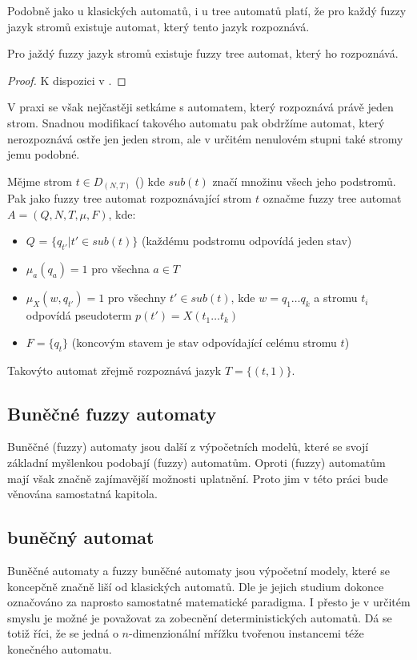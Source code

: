 \documentclass[a4paper,10pt]{article}
\begin{document}
Podobně jako u klasických automatů, i u tree automatů platí, že pro každý fuzzy jazyk stromů existuje automat, který tento jazyk rozpoznává.
\begin{theorem}
 Pro jaždý fuzzy jazyk stromů existuje fuzzy tree automat, který ho rozpoznává.
\end{theorem}
\begin{proof}
 K dispozici v \cite{MorMal-FuzzyLangThe}.
\end{proof}

V praxi se však nejčastěji setkáme s automatem, který rozpoznává právě jeden strom. Snadnou modifikací takového automatu pak obdržíme automat, který nerozpoznává ostře jen jeden strom, ale v určitém nenulovém stupni také stromy jemu podobné.

\begin{definition}
  Mějme strom $t \in D_{(N, T)}$ () kde $sub(t)$ značí množinu všech jeho podstromů. Pak jako fuzzy tree automat rozpoznávající strom $t$ označme fuzzy tree automat $A = (Q, N, T, \mu, F)$, kde:
  \begin{itemize}
   \item $Q$ = $\{ q_{t'} | t' \in sub(t) \}$ (každému podstromu odpovídá jeden stav)
   \item $\mu_a(q_a) = 1$ pro všechna $a \in T$
   \item $\mu_X(w, q_{t'}) = 1$ pro všechny $t' \in sub(t)$, kde $w = q_1 \dots q_k$ a stromu $t_i$ odpovídá pseudoterm $p(t') = X(t_1 \dots t_k)$
   \item $F = \{ q_t \}$ (koncovým stavem je stav odpovídající celému stromu $t$)
  \end{itemize}
\end{definition}

Takovýto automat zřejmě rozpoznává jazyk $T = \{ (t, 1) \}$. 


\subsection{Buněčné fuzzy automaty}

Buněčné (fuzzy) automaty jsou další z výpočetních modelů, které se svojí základní myšlenkou podobají (fuzzy) automatům. Oproti  (fuzzy) automatům mají však značně zajímavější možnosti uplatnění. Proto jim v této práci bude věnována samostatná kapitola.

\subsection{ buněčný automat}
Buněčné automaty a fuzzy buněčné automaty jsou výpočetní modely, které se koncepčně značně liší od klasických automatů. Dle \cite{Wol-NewKinSci} je jejich studium dokonce označováno za naprosto samostatné matematické paradigma. I přesto je v určitém smyslu je možné je považovat za zobecnění  deterministických automatů. Dá se totiž říci, že se jedná o $n$-dimenzionální mřížku tvořenou instancemi téže konečného automatu.
\end{document}
